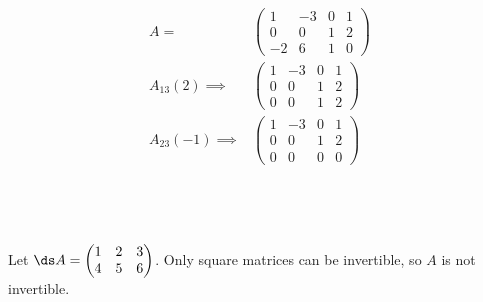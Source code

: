 \documentclass[a4paper]{article}
\begin{document}
\begin{align*}
A = &\begin{pmatrix}
	1 & -3 & 0 & 1\\
	0 & 0 & 1 & 2\\
	-2 & 6 & 1 & 0
\end{pmatrix}\\[1ex]
A_{13}(2) \implies &\begin{pmatrix}
	1 & -3 & 0 & 1\\
	0 & 0 & 1 & 2\\
	0 & 0 & 1 & 2
\end{pmatrix}\\[1ex]
A_{23}(-1) \implies &\begin{pmatrix}
	1 & -3 & 0 & 1\\
	0 & 0 & 1 & 2\\
	0 & 0 & 0 & 0
\end{pmatrix}
\end{align*}


\subsection{~}

Let $\ds A = \begin{pmatrix}1 & 2 & 3\\ 4 & 5 & 6\end{pmatrix}$. Only square matrices can be invertible, so $A$ is not invertible.

\subsection{~}
\end{document}
